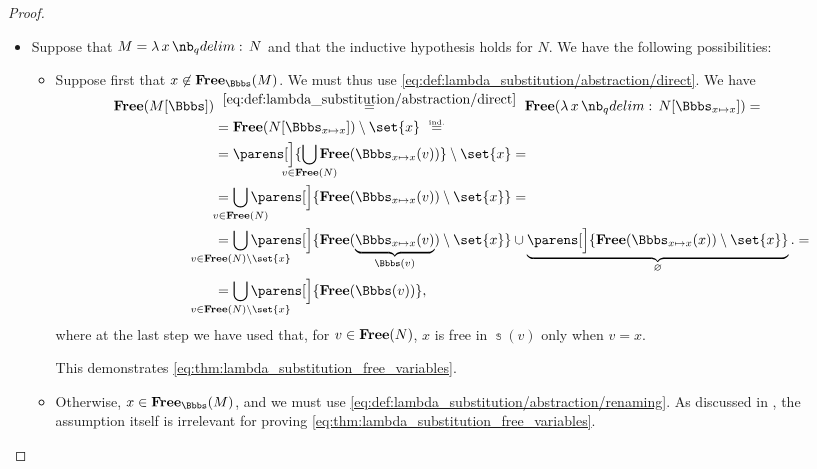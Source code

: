 \begin{proof}
\begin{itemize}
    \item Suppose that \( M = \qabs x N \) and that the inductive hypothesis holds for \( N \). We have the following possibilities:
    \begin{itemize}
      \item Suppose first that \( x \not\in \op*{Free}_\Bbbs(M) \). We must thus use \eqref{eq:def:lambda_substitution/abstraction/direct}. We have
      \begin{align*}
        \op*{Free}(M[\Bbbs])
        &\reloset{\eqref{eq:def:lambda_substitution/abstraction/direct}} =
        \op*{Free}(\qabs x N[\Bbbs_{x \mapsto x}])
        = \\ &=
        \op*{Free}(N[\Bbbs_{x \mapsto x}]) \setminus \set{ x }
        \reloset{\T{ind.}} = \\ &=
        \parens[\Big]{ \bigcup_{\mathclap{v \in \op*{Free}(N)}} \op*{Free}(\Bbbs_{x \mapsto x}(v)) } \setminus \set{ x }
        = \\ &=
        \bigcup_{\mathclap{v \in \op*{Free}(N)}} \parens[\Big]{ \op*{Free}(\Bbbs_{x \mapsto x}(v)) \setminus \set{ x } }
        = \\ &=
        \bigcup_{\mathclap{v \in \op*{Free}(N) \setminus \set{ x }}} \parens[\Big]{ \op*{Free}(\underbrace{\Bbbs_{x \mapsto x}(v)}_{\Bbbs(v)}) \setminus \set{ x } } \cup \underbrace{\parens[\Big]{ \op*{Free}(\Bbbs_{x \mapsto x}(x)) \setminus \set{ x } }}_\varnothing.
        = \\ &=
        \bigcup_{\mathclap{v \in \op*{Free}(N) \setminus \set{ x }}} \parens[\Big]{ \op*{Free}(\Bbbs(v)) },
      \end{align*}
      where at the last step we have used that, for \( v \in \op*{Free}(N) \), \( x \) is free in \( \Bbbs(v) \) only when \( v = x \).

      This demonstrates \eqref{eq:thm:lambda_substitution_free_variables}.

      \item Otherwise, \( x \in \op*{Free}_\Bbbs(M) \), and we must use \eqref{eq:def:lambda_substitution/abstraction/renaming}. As discussed in , the assumption itself is irrelevant for proving \eqref{eq:thm:lambda_substitution_free_variables}.


\end{itemize}
\end{itemize}
\end{proof}
